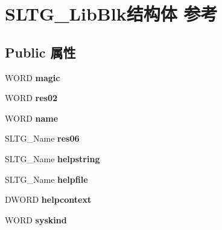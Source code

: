 \hypertarget{struct_s_l_t_g___lib_blk}{}\section{S\+L\+T\+G\+\_\+\+Lib\+Blk结构体 参考}
\label{struct_s_l_t_g___lib_blk}
\subsection*{Public 属性}
\begin{DoxyCompactItemize}
\item 
\mbox{\label{struct_s_l_t_g___lib_blk_ab441f540ac7f12232cfd4060203685fb}} 
W\+O\+RD {\bfseries magic}
\item 
\mbox{\label{struct_s_l_t_g___lib_blk_a55419b2c76d9193381bb8faa37834ba7}} 
W\+O\+RD {\bfseries res02}
\item 
\mbox{\label{struct_s_l_t_g___lib_blk_a268d578fbe2a965ff8534b0fea732c92}} 
W\+O\+RD {\bfseries name}
\item 
\mbox{\label{struct_s_l_t_g___lib_blk_a21022720932f7415d74c85d2a234ae9e}} 
S\+L\+T\+G\+\_\+\+Name {\bfseries res06}
\item 
\mbox{\label{struct_s_l_t_g___lib_blk_aa67e6ebe6e8ff7aa548f2389882ee03d}} 
S\+L\+T\+G\+\_\+\+Name {\bfseries helpstring}
\item 
\mbox{\label{struct_s_l_t_g___lib_blk_af5d7d9eb9c80d84907b0f74ee8baa850}} 
S\+L\+T\+G\+\_\+\+Name {\bfseries helpfile}
\item 
\mbox{\label{struct_s_l_t_g___lib_blk_acd4795b853ff0caa23400ec7d7e37d69}} 
D\+W\+O\+RD {\bfseries helpcontext}
\item 
\mbox{\label{struct_s_l_t_g___lib_blk_a458f388c30c7aa92573be2cc1cf05da7}} 
W\+O\+RD {\bfseries syskind}
\item 
\mbox{\label{struct_s_l_t_g___lib_blk_a4103455bac585de13034907a10c33254}} 

\end{DoxyCompactItemize}

